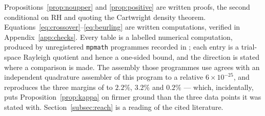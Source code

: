 \begin{remark}\label{rem:samplingstatus}
Propositions~\ref{prop:noupper} and \ref{prop:positive} are written proofs, the
second conditional on RH and quoting the Cartwright density theorem.
Equations~\eqref{eq:crossover}--\eqref{eq:beurling} are written computations,
verified in Appendix~\ref{app:checks}. Every table is a labelled numerical
computation, produced by unregistered \texttt{mpmath} programmes recorded in
\cite{FrameBoundNote}; each entry is a trial-space Rayleigh quotient and hence a
one-sided bound, and the direction is stated where a comparison is made. The
assembly those programmes use agrees with an independent quadrature assembler of
this program to a relative $6\times10^{-25}$, and reproduces the three margins of
\cite{CriticalPath} to $2.2\%$, $3.2\%$ and $0.2\%$ --- which, incidentally, puts
Proposition~\ref{prop:kappa} on firmer ground than the three data points it was
stated with. Section~\ref{subsec:reach} is a reading of the cited literature.
\end{remark}
